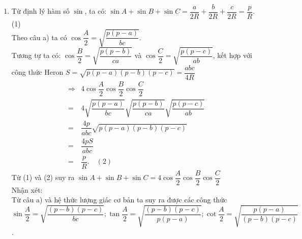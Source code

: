 \begin{bt}
{\begin{enumerate}
            Trong tam giác $A D I$ vuông tại $I$, ta có:
            $$
            \cos \dfrac{A}{2}=\cos A D I=\dfrac{D I}{A D}=\dfrac{B D}{2 c}=\sqrt{\dfrac{p(p-a)}{b c}} .
            $$
            Vậy $\cos \dfrac{A}{2}=\sqrt{\dfrac{p(p-a)}{b c}}$.
            \item Từ định lý hàm số $\sin$, ta có: $\sin A+\sin B+\sin C=\dfrac{a}{2 R}+\dfrac{b}{2 R}+\dfrac{c}{2 R}=\dfrac{p}{R}$.\qquad (1)\\
            Theo câu a) ta có $\cos \dfrac{A}{2}=\sqrt{\dfrac{p(p-a)}{b c}}$.\\
            Tương tự ta có: $\cos \dfrac{B}{2}=\sqrt{\dfrac{p(p-b)}{c a}}$ và $\cos \dfrac{C}{2}=\sqrt{\dfrac{p(p-c)}{a b}}$,
            kết hợp với công thức Heron $S=\sqrt{p(p-a)(p-b)(p-c)}=\dfrac{a b c}{4 R}$
            \allowdisplaybreaks
            \begin{eqnarray*}
                &\Rightarrow &4 \cos \dfrac{A}{2} \cos \dfrac{B}{2} \cos \dfrac{C}{2} \\
                &=&4 \sqrt{\dfrac{p(p-a)}{b c}} \sqrt{\dfrac{p(p-b)}{c a}} \sqrt{\dfrac{p(p-c)}{a b}} \\
                &=&\dfrac{4 p}{a b c} \sqrt{p(p-a)(p-b)(p-c)} \\
                &=&\dfrac{4 p S}{a b c}\\
                &=&\dfrac{p}{R}. \quad (2)
            \end{eqnarray*}
            Từ (1) và (2) suy ra $\sin A+\sin B+\sin C=4 \cos \dfrac{A}{2} \cos \dfrac{B}{2} \cos \dfrac{C}{2}$\\
            Nhận xét: \\
            Từ câu a) và hệ thức lượng giác cơ bản ta suy ra được các công thức \break $\sin \dfrac{A}{2}=\sqrt{\dfrac{(p-b)(p-c)}{b c}} ; \tan \dfrac{A}{2}=\sqrt{\dfrac{(p-b)(p-c)}{p(p-a)}} ; \cot \dfrac{A}{2}=\sqrt{\dfrac{p(p-a)}{(p-b)(p-c)}}$.
        \end{enumerate}
        
    }
\end{bt}

